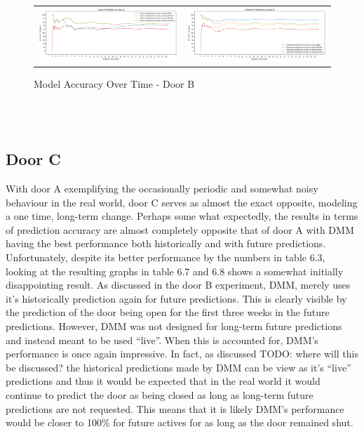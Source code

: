 \begin{figure}
  \begin{tabular}{cc}
    {\includegraphics[width = 3in]{images/results/Future_Predictions_on_door_B.png}} &
    {\includegraphics[width = 3in]{images/results/Historical_Predictions_on_door_B.png}} \\
  \end{tabular}
  \caption{Model Accuracy Over Time - Door B}
\end{figure}\\ \\



\subsection { Door C }

With door A exemplifying the occasionally periodic and somewhat noisy
behaviour in the real world, door C serves as almost the exact opposite,
modeling a one time, long-term change.
Perhaps some what expectedly, the results in terms of prediction accuracy are
almost completely opposite that of door A with DMM having the best
performance both historically and with future predictions. \\

Unfortunately, despite its better performance by the numbers in table 6.3,
looking at the resulting graphs in table 6.7 and 6.8 shows a somewhat
initially disappointing result. As discussed in the door B experiment,
DMM, merely uses it's historically prediction again for future
predictions. This is clearly visible by the prediction of the door being open
for the first three weeks in the future predictions.  However, DMM was not
designed for long-term future predictions and instead meant to be used
``live''. When this is accounted for, DMM's performance is once again
impressive.  In fact, as discussed TODO: where will this be discussed? the
historical predictions made by DMM can be view as it's ``live''
predictions and thus it would be expected that in the real world it would
continue to predict the door as being closed as long as long-term future
predictions are not requested. This means that it is likely DMM's
performance would be closer to 100\% for future actives for as long as the door
remained shut. \\

